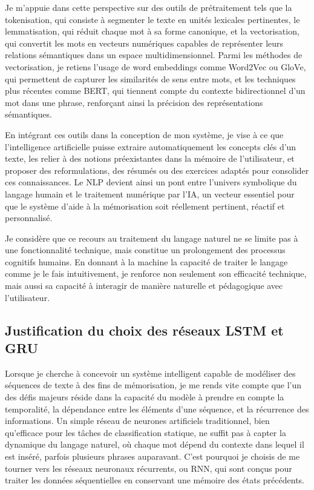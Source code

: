 \documentclass[11pt,a4paper]{report}
\begin{document}
Je m’appuie dans cette perspective sur des outils de prétraitement tels que la tokenisation, qui consiste à segmenter le texte en unités lexicales pertinentes, le lemmatisation, qui réduit chaque mot à sa forme canonique, et la vectorisation, qui convertit les mots en vecteurs numériques capables de représenter leurs relations sémantiques dans un espace multidimensionnel. Parmi les méthodes de vectorisation, je retiens l’usage de word embeddings comme Word2Vec ou GloVe, qui permettent de capturer les similarités de sens entre mots, et les techniques plus récentes comme BERT, qui tiennent compte du contexte bidirectionnel d’un mot dans une phrase, renforçant ainsi la précision des représentations sémantiques.

En intégrant ces outils dans la conception de mon système, je vise à ce que l’intelligence artificielle puisse extraire automatiquement les concepts clés d’un texte, les relier à des notions préexistantes dans la mémoire de l’utilisateur, et proposer des reformulations, des résumés ou des exercices adaptés pour consolider ces connaissances. Le NLP devient ainsi un pont entre l’univers symbolique du langage humain et le traitement numérique par l’IA, un vecteur essentiel pour que le système d’aide à la mémorisation soit réellement pertinent, réactif et personnalisé.

Je considère que ce recours au traitement du langage naturel ne se limite pas à une fonctionnalité technique, mais constitue un prolongement des processus cognitifs humains. En donnant à la machine la capacité de traiter le langage comme je le fais intuitivement, je renforce non seulement son efficacité technique, mais aussi sa capacité à interagir de manière naturelle et pédagogique avec l’utilisateur.

\subsection{Justification du choix des réseaux LSTM et GRU}

Lorsque je cherche à concevoir un système intelligent capable de modéliser des séquences de texte à des fins de mémorisation, je me rends vite compte que l’un des défis majeurs réside dans la capacité du modèle à prendre en compte la temporalité, la dépendance entre les éléments d’une séquence, et la récurrence des informations. Un simple réseau de neurones artificiels traditionnel, bien qu’efficace pour les tâches de classification statique, ne suffit pas à capter la dynamique du langage naturel, où chaque mot dépend du contexte dans lequel il est inséré, parfois plusieurs phrases auparavant. C’est pourquoi je choisis de me tourner vers les réseaux neuronaux récurrents, ou RNN, qui sont conçus pour traiter les données séquentielles en conservant une mémoire des états précédents.
\end{document}

